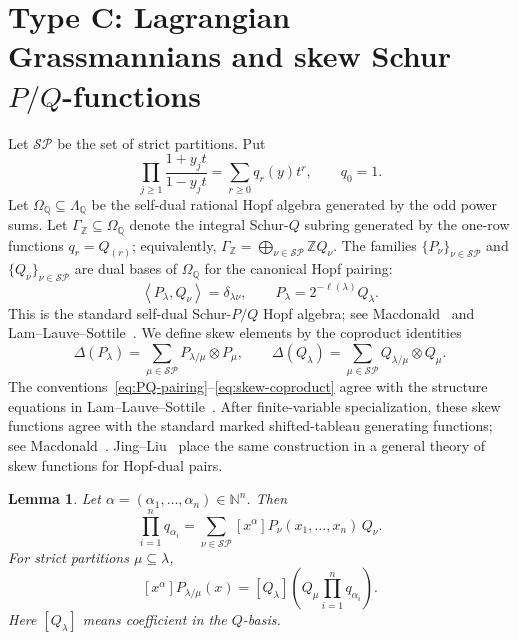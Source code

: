 \documentclass[11pt,a4paper,oneside]{amsart}
\numberwithin{equation}{section}
\newtheorem{lemma}[theorem]{Lemma}
\theoremstyle{definition}
\theoremstyle{remark}
\newcommand{\N}{\mathbb N}
\newcommand{\Z}{\mathbb Z}
\newcommand{\Q}{\mathbb Q}
\newcommand{\angles}[1]{\left\langle #1\right\rangle}
\begin{document}
\section{Type C: Lagrangian Grassmannians and skew Schur \texorpdfstring{$P/Q$}{P/Q}-functions}\label{sec:typeC}


Let $\mathcal{SP}$ be the set of strict partitions.  Put
\begin{equation}\label{eq:q-generating}
 \prod_{j\geq1}\frac{1+y_jt}{1-y_jt}
 =\sum_{r\geq0}q_r(y)t^r,
 \qquad q_0=1.
\end{equation}
Let $\Omega_{\Q}\subseteq\Lambda_{\Q}$ be the self-dual rational Hopf algebra generated by the odd power sums.  Let
$\Gamma_{\Z}\subseteq\Omega_{\Q}$ denote the integral Schur-$Q$ subring generated by the one-row functions $q_r=Q_{(r)}$; equivalently,
$\Gamma_{\Z}=\bigoplus_{\nu\in\mathcal{SP}}\Z Q_\nu$.  The families
$\{P_\nu\}_{\nu\in\mathcal{SP}}$ and $\{Q_\nu\}_{\nu\in\mathcal{SP}}$ are dual bases of $\Omega_{\Q}$ for the canonical Hopf pairing:
\begin{equation}\label{eq:PQ-pairing}
 \angles{P_\lambda,Q_\nu}=\delta_{\lambda\nu},
 \qquad
 P_\lambda=2^{-\ell(\lambda)}Q_\lambda.
\end{equation}
This is the standard self-dual Schur-$P/Q$ Hopf algebra; see Macdonald~\cite[Chapter~III, Section~8]{Macdonald} and Lam--Lauve--Sottile~\cite[Section~4]{LLS11}.  We define skew elements by the coproduct identities
\begin{equation}\label{eq:skew-coproduct}
 \Delta(P_\lambda)=\sum_{\mu\in\mathcal{SP}}P_{\lambda/\mu}\otimes P_\mu,
 \qquad
 \Delta(Q_\lambda)=\sum_{\mu\in\mathcal{SP}}Q_{\lambda/\mu}\otimes Q_\mu.
\end{equation}
The conventions~\eqref{eq:PQ-pairing}--\eqref{eq:skew-coproduct} agree with the structure equations in Lam--Lauve--Sottile~\cite[equations~(17)--(18)]{LLS11}.  After finite-variable specialization, these skew functions agree with the standard marked shifted-tableau generating functions; see Macdonald~\cite[Chapter~III, Section~8]{Macdonald}.  Jing--Liu~\cite[Section~2]{JingLiu26} place the same construction in a general theory of skew functions for Hopf-dual pairs.

\begin{lemma}\label{lem:Cauchy-coeff}
Let $\alpha=(\alpha_1,\ldots,\alpha_n)\in\N^n$.  Then
\begin{equation}\label{eq:Cauchy-straight-coeff}
 \prod_{i=1}^nq_{\alpha_i}
 =\sum_{\nu\in\mathcal{SP}}
   [x^\alpha]P_\nu(x_1,\ldots,x_n)\,Q_\nu.
\end{equation}
For strict partitions $\mu\subseteq\lambda$,
\begin{equation}\label{eq:Cauchy-skew-coeff}
 [x^\alpha]P_{\lambda/\mu}(x)
 =[Q_\lambda]\left(Q_\mu\prod_{i=1}^nq_{\alpha_i}\right).
\end{equation}
Here $[Q_\lambda]$ means coefficient in the $Q$-basis.
\end{lemma}
\end{document}
